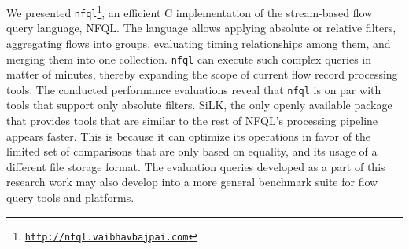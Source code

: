 We presented
\texttt{nfql}\footnote{\texttt{\url{http://nfql.vaibhavbajpai.com}}}, an
efficient C implementation of the stream-based flow query language, \ac{NFQL}.
The language allows applying absolute or relative filters, aggregating flows
into groups, evaluating timing relationships among them, and merging them into
one collection. \texttt{nfql} can execute such complex queries in matter of
minutes, thereby expanding the scope of current flow record processing tools.
The conducted performance evaluations reveal that \texttt{nfql} is on par with
tools that support only absolute filters. SiLK, the only openly available
package that provides tools that are similar to the rest of \ac{NFQL}'s
processing pipeline appears faster. This is because it can optimize its
operations in favor of the limited set of comparisons that are only based on
equality, and its usage of a different file storage format. The evaluation
queries developed as a part of this research work may also develop into a more
general benchmark suite for flow query tools and platforms.
